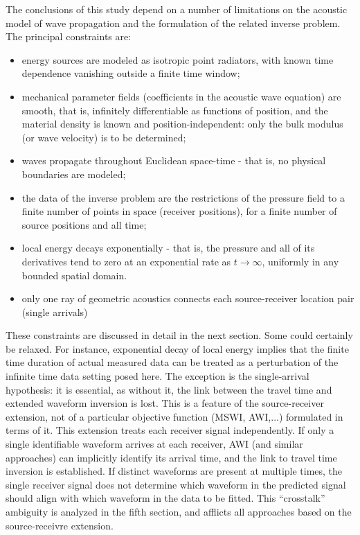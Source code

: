 The conclusions of this study depend on a number of limitations on the
acoustic model of wave propagation and the formulation of the related
inverse problem. The principal constraints are:
\begin{itemize}
\item energy sources are modeled as isotropic point radiators, with
  known time dependence vanishing outside a finite time window;
\item mechanical parameter fields (coefficients in the acoustic wave
  equation) are smooth, that is, infinitely differentiable as
  functions of position, and the material density is known and
  position-independent: only the bulk modulus (or wave velocity) is
  to be determined;
\item waves propagate throughout Euclidean space-time - that is, no
  physical boundaries are modeled;
\item the data of the inverse problem are the restrictions of the
  pressure field to a finite number of points in space (receiver
  positions), for a finite number of source positions and all time;
\item local energy decays exponentially - that is, the pressure and
  all of its derivatives tend to zero at an exponential rate as $t
  \rightarrow \infty$,
  uniformly in any bounded spatial domain.
\item only one ray of geometric
  acoustics connects each source-receiver location pair (single arrivals)
\end{itemize}

These constraints are discussed in detail in the next section. Some
could certainly be relaxed. For instance, exponential decay of local
energy implies that the finite time duration of actual measured data
can be treated as a perturbation of the infinite time data setting
posed here. The exception is the single-arrival hypothesis: it is
essential, as without it, the link between the travel time and
extended waveform inversion is lost. This is a feature of the
source-receiver extension, not of a particular objective function
(MSWI, AWI,...) formulated in terms of it. This extension treats each receiver signal
independently. If only a single identifiable waveform arrives at
each receiver, AWI (and similar approaches) can implicitly identify
its arrival time, and the link to travel time inversion is
established. If distinct waveforms are present at multiple times,
the single receiver signal does not determine which waveform in the
predicted signal should align with which waveform in the data to be
fitted. This ``crosstalk'' ambiguity is analyzed in the fifth
section, and afflicts all approaches based on the source-receivre
extension.

